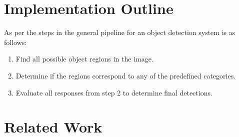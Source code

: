 \section{Implementation Outline}
As per \cite{zhang} the steps in the general pipeline for an object detection system is as follows:

\begin{enumerate}
	\item Find all possible object regions in the image.
	\item Determine if the regions correspond to any of the predefined categories.
	\item Evaluate all responses from step 2 to determine final detections.
\end{enumerate}


\section{Related Work}